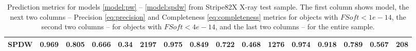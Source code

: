\documentclass[fleqn,usenatbib]{mnras}
\begin{document}
\begin{table}
\begin{tabular}{lllllrllllrllllr}
            SPDW  &                    \textbf{0.969} &  \textbf{0.805} &  \textbf{0.666} &  \textbf{0.34} &        2197 &                    \textbf{0.975} &  \textbf{0.849} &  \textbf{0.722} &  \textbf{0.468} &        1276 &                   \textbf{0.974} &  \textbf{0.918} &  \textbf{0.789} &  \textbf{0.567} &         208 \\
            \hline
            \end{tabular}
            \caption{Prediction metrics for models \ref{model:pw} -- \ref{model:spdw} from Stripe82X X-ray test sample. The first column shows model, the next two columns -- Precision \ref{eq:precision} and Completeness \ref{eq:completeness} metrics for objects with $FSoft < 1e-14$, the second two columns -- for objects with $FSoft < 4e-14$, and the last two columns -- for the entire sample.}
\end{table}
\end{document}
